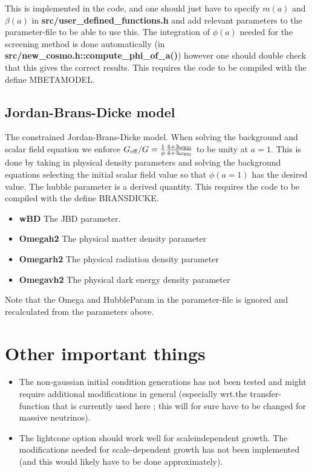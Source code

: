 \documentclass[usenatbib]{article}
\begin{document}
This is implemented in the code, and one should just have to specify $m(a)$ and $\beta(a)$ in \textbf{src/user\_defined\_functions.h} and add relevant parameters to the parameter-file to be able to use this. The integration of $\phi(a)$ needed for the screening method is done automatically (in \textbf{src/new\_cosmo.h::compute\_phi\_of\_a()}) however one should double check that this gives the correct results. This requires the code to be compiled with the define MBETAMODEL.

\subsection*{Jordan-Brans-Dicke model}

The constrained Jordan-Brans-Dicke model. When solving the background and scalar field equation we enforce $G_{\rm eff}/G = \frac{1}{\phi} \frac{4+3\omega_{\rm BD}}{4+3\omega_{\rm BD}}$ to be unity at $a=1$. This is done by taking in physical density parameters and solving the background equations selecting the initial scalar field value so that $\phi(a=1)$ has the desired value. The hubble parameter is a derived quantity. This requires the code to be compiled with the define BRANSDICKE.

\begin{itemize}

\item \textbf{wBD} The JBD parameter.
\item \textbf{Omegah2} The physical matter density parameter
\item \textbf{Omegarh2} The physical radiation density parameter
\item \textbf{Omegavh2} The physical dark energy density parameter

\end{itemize}

Note that the Omega and HubbleParam in the parameter-file is ignored and recalculated from the parameters above.

\section*{Other important things}

\begin{itemize}
\item The non-gaussian initial condition generations has not been tested and might require additional modifications in general (especially wrt.the transfer-function that is currently used here ; this will for sure have to be changed for massive neutrinos).
\item The lightcone option should work well for scaleindependent growth. The modifications needed for scale-dependent growth has not been implemented (and this would likely have to be done approximately).
\end{itemize}
\end{document}
